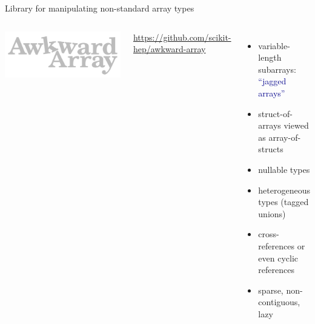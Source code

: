\documentclass[aspectratio=169]{beamer}
\begin{document}
\begin{frame}{Library for manipulating non-standard array types}
\vspace{0.25 cm}
\begin{columns}
\includegraphics[width=\linewidth]{awkward-logo.pdf}

\vspace{0.25 cm}
\hfill \scriptsize \textcolor{darkblue}{\mbox{\hspace{-0.75 cm}\url{https://github.com/scikit-hep/awkward-array}\hspace{-0.65 cm}}}

\vspace{0.5 cm}
\vspace{2\baselineskip}
\begin{itemize}
\item variable-length subarrays: \textcolor{darkblue}{``jagged arrays''}
\item struct-of-arrays viewed as array-of-structs
\item nullable types
\item heterogeneous types (tagged unions)
\item cross-references or even cyclic references
\item sparse, non-contiguous, lazy
\end{itemize}

\vspace{0.5 cm}
\end{columns}
\end{frame}
\end{document}
